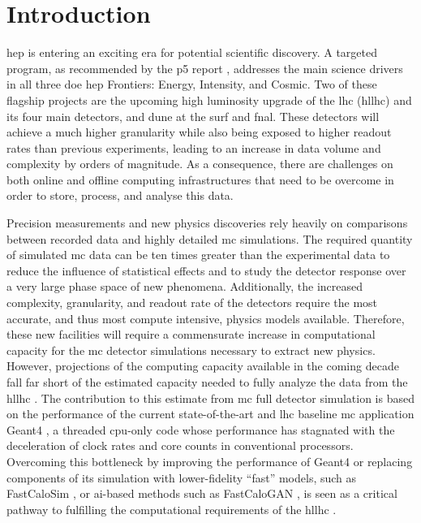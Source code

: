 \section{Introduction}

\ac{hep} is entering an exciting era for potential scientific discovery. A
targeted program, as recommended by the \ac{p5} report
\cite{ritz_building_2014}, addresses the main science drivers in all three
\ac{doe} \ac{hep} Frontiers: Energy, Intensity, and Cosmic. Two of these
flagship projects are the upcoming high luminosity upgrade of the \acl{lhc}
(\acs{hllhc}) and its four main detectors, and \ac{dune} at the \ac{surf}
and \ac{fnal}. These detectors will achieve a much higher granularity while also
being exposed to higher readout rates than previous experiments, leading to an
increase in data volume and complexity by orders of magnitude. As a consequence,
there are challenges on both online and offline computing infrastructures that
need to be overcome in order to store, process, and analyse this data.

Precision measurements and new physics discoveries rely heavily on comparisons
between recorded data and highly detailed \ac{mc} simulations. The required
quantity of simulated \ac{mc} data can be ten times greater than the
experimental data to reduce the influence of statistical effects and to study
the detector response over a very large phase space of new phenomena.
Additionally, the increased complexity, granularity, and readout rate of the
detectors require the most accurate, and thus most compute intensive, physics
models available. Therefore, these new facilities will require a commensurate
increase in computational capacity for the \ac{mc} detector simulations
necessary to extract new physics. However, projections of the computing capacity
available in the coming decade fall far short of the estimated capacity needed
to fully analyze the data from the \acs{hllhc}
\cite{the_atlas_collaboration_atlas_2020,cms-offline-computing-results}. The
contribution to this estimate from \ac{mc} full detector simulation is based on
the performance of the current state-of-the-art and \acs{lhc} baseline \ac{mc}
application Geant4 \cite{geant4_status_2016}, a threaded \acs{cpu}-only code
whose performance has stagnated with the deceleration of clock rates and core
counts in conventional processors. Overcoming this bottleneck by improving the
performance of Geant4 or replacing components of its simulation with
lower-fidelity ``fast'' models, such as FastCaloSim \cite{fastcalosim}, or
\ac{ai}-based methods such as FastCaloGAN \cite{fastcalogan}, is seen as a
critical pathway to fulfilling the computational requirements of the \acs{hllhc}
\cite{the_hep_software_foundation_roadmap_2019}.

